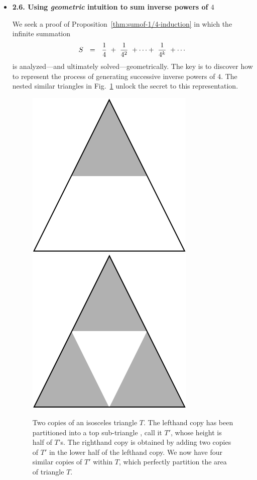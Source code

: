 \begin{itemize}
\medskip \item
{\bf 2.6. Using {\em geometric} intuition to sum inverse powers of $4$}

\smallskip

We seek a proof of Proposition~\ref{thm:sumof-1/4-induction} in which the infinite summation
\[ S \ \ = \ \  {1 \over 4} \ + \  {1 \over 4^2} \ + \cdots + \ {1 \over 4^k} \ + \cdots  \]
is analyzed---and ultimately solved---geometrically.  The key is to discover how to represent the process of generating successive inverse powers of $4$.  The nested similar triangles in Fig.~\ref {Fig:Sumgeosimilar} unlock the secret to this representation.
\begin{figure}[ht]
\begin{center}
        \includegraphics[scale=0.3]{FiguresMaths/Sum1over4topTriangle}
        \hspace{1cm}
        \includegraphics[scale=0.3]{FiguresMaths/Sum1over4similarTriangles}
\caption{Two copies of an isosceles triangle $T$.  The lefthand copy has been partitioned into a top sub-triangle , call it $T'$, whose height is half of $T$'s.  The righthand copy is obtained by adding two copies of $T'$ in the lower half of the lefthand copy.  We now have four similar copies of $T'$ within $T$, which perfectly partition the area of triangle $T$.}
        \label{Fig:Sumgeosimilar}
\end{center}
\end{figure}



\end{itemize}
